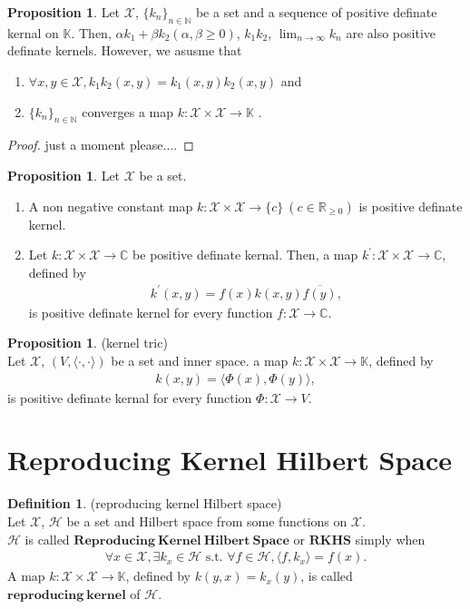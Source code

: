 \documentclass[11pt, a4paper, english, dvipdfmx]{jsarticle}
\theoremstyle{definition}
\newtheorem{Definition+}[Axiom+]{Definition}
\newtheorem{Proposition+}[Axiom+]{Proposition}
\def\inner<#1>{\langle #1 \rangle}
\newcommand{\N}{\mathbb{N}}
\newcommand{\R}{\mathbb{R}}
\newcommand{\C}{\mathbb{C}}
\newcommand{\K}{\mathbb{K}}
\newcommand{\X}{\mathcal{X}}
\newcommand{\Hil}{\mathcal{H}}
\newcommand{\dip}{\displaystyle}
\begin{document}
\begin{Proposition+}
    Let $\X$, $\{k_{n}\}_{n\in\N}$ be a set and a sequence of positive definate kernal on $\K$.
    Then, $\alpha k_{1} + \beta k_{2}(\alpha, \beta \geq 0)$, $k_{1}k_{2}$, $\dip \lim_{n\to\infty}k_{n}$ are also positive definate kernels.
    However, we asusme that 
    \begin{enumerate}
        \item $\forall x, y\in\X, k_{1}k_{2}(x, y) = k_{1}(x, y)k_{2}(x, y)$ and
        \item $\{k_{n}\}_{n\in\N}$ converges a map $k:\X\times\X\to\K$ .
    \end{enumerate}
    \begin{proof}
        just a moment please....
    \end{proof}
\end{Proposition+}

\begin{Proposition+}
    Let $\X$ be a set.
    \begin{enumerate}
        \item A non negative constant map $k:\X\times\X\to\{c\}~(c\in\R_{\geq 0})$ is positive definate kernel.
        \item Let $k:\X\times\X\to\C$ be positive definate kernal. Then, a map $k^{'}:\X\times\X\to\C$, defined by 
        \begin{align*}
            k^{'}(x, y) = f(x)k(x, y)\overline{f(y)},
        \end{align*} 
        is positive definate kernel for every function $f:\X\to\C$.
    \end{enumerate}
\end{Proposition+}

\begin{Proposition+}(kernel tric)\\
    Let $\X$, $(V, \inner<\cdot, \cdot>)$ be a set and inner space. a map $k:\X\times\X\to\K$, defined by 
    \begin{align*}
        k(x, y) = \inner<\Phi(x), \Phi(y)>,
    \end{align*}
    is positive definate kernal for every function $\Phi:\X\to V$.
\end{Proposition+}
\section{Reproducing Kernel Hilbert Space}
\begin{Definition+}(reproducing kernel Hilbert space)\\
    Let $\X$, $\Hil$ be a set and Hilbert space from some functions on $\X$.\\
    $\Hil$ is called $\mathbf{Reproducing~Kernel~Hilbert~Space}$ or $\mathbf{RKHS}$ simply when
    \begin{align*}
        \forall x\in\X, \exists k_{x}\in\Hil\text{ s.t. }\forall f\in\Hil, \inner<f, k_{x}> = f(x).
    \end{align*} 
    A map $k:\X\times\X\to\K$, defined by $k(y, x) = k_{x}(y)$, is called $\mathbf{reproducing~kernel}$ of $\Hil$. 
\end{Definition+}
\end{document}
